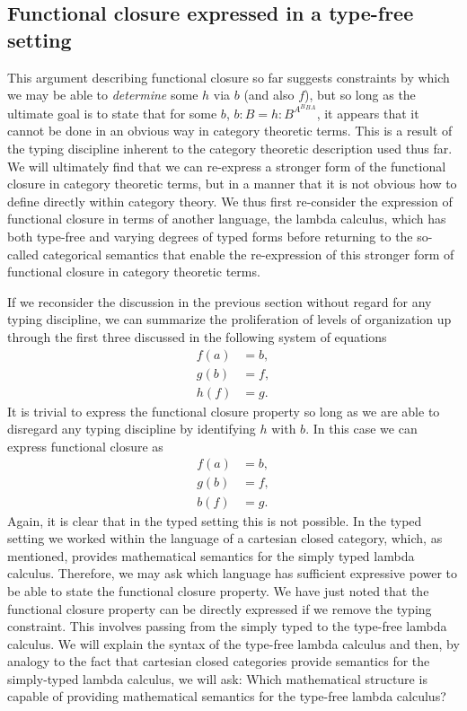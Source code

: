 \subsection*{Functional closure expressed in a type-free setting}
This argument describing functional closure so far suggests constraints by which we may be able to \emph{determine} some $h$ via $b$ (and also $f$), but so long as the ultimate goal is to state that for some $b$, $b:B = h:B^{A^B{^B{^A}}}$, it appears that it cannot be done in an obvious way in category theoretic terms. This is a result of the typing discipline inherent to the category theoretic description used thus far. We will ultimately find that we can re-express a stronger form of the functional closure in category theoretic terms, but in a manner that it is not obvious how to define directly within category theory. We thus first re-consider the expression of functional closure in terms of another language, the lambda calculus, which has both type-free and varying degrees of typed forms \cite{Barendregt1985} before returning to the so-called categorical semantics that enable the re-expression of this stronger form of functional closure in category theoretic terms.

If we reconsider the discussion in the previous section without regard for any typing discipline, we can summarize the proliferation of levels of organization up through the first three discussed in the following system of equations
\begin{align*}
f(a)&=b,\\
g(b)&=f,\\
h(f)&=g.
\end{align*}
It is trivial to express the functional closure property so long as we are able to disregard any typing discipline by identifying $h$ with $b$. In this case we can express functional closure as
\begin{align*}
f(a)&=b,\\
g(b)&=f,\\
b(f)&=g.
\end{align*}
Again, it is clear that in the typed setting this is not possible. In the typed setting we worked within the language of a cartesian closed category, which, as mentioned, provides mathematical semantics for the simply typed lambda calculus. Therefore, we may ask which language has sufficient expressive power to be able to state the functional closure property. We have just noted that the functional closure property can be directly expressed if we remove the typing constraint. This involves passing from the simply typed to the type-free lambda calculus. We will explain the syntax of the type-free lambda calculus and then, by analogy to the fact that cartesian closed categories provide semantics for the simply-typed lambda calculus, we will ask: Which mathematical structure is capable of providing mathematical semantics for the type-free lambda calculus?

